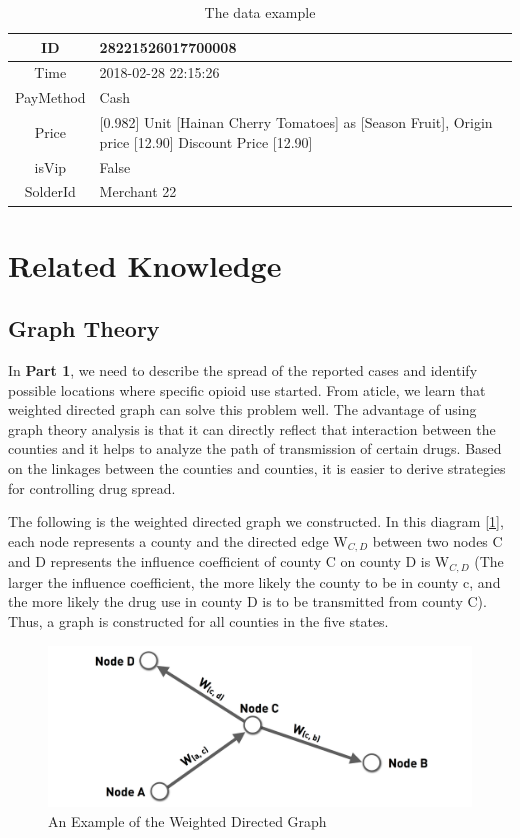 \documentclass{mcmthesis}
\begin{document}
\begin{table}[h]
	\centering
	\caption{The data example} \label{table-notations}
	\begin{tabular}{cp{20em}}
		\toprule
		ID & 28221526017700008\\
		\hline
		Time & 2018-02-28 22:15:26\\
		\hline
		PayMethod & Cash\\
		\hline
		Price & [0.982] Unit [Hainan Cherry Tomatoes] as [Season Fruit], Origin price [12.90] Discount Price [12.90]\\
		\hline
		isVip & False\\
		\hline
		SolderId & Merchant 22\\
		\bottomrule
	\end{tabular}
\end{table}

\section{Related Knowledge}

\subsection*{Graph Theory}
In \textbf{Part 1}, we need to describe the spread of the reported cases and identify possible locations where specific opioid use started. From aticle\cite{2}, we learn that weighted directed graph can solve this problem well. The advantage of using graph theory analysis is that it can directly reflect that interaction between the counties and it helps to analyze the path of transmission of certain drugs. Based on the linkages between the counties and counties, it is easier to derive strategies for controlling drug spread.

The following is the weighted directed graph we constructed. In this diagram [\ref{graph}], each node represents a county and the directed edge W$_{C,D}$ between two nodes C and D represents the influence coefficient of county C on county D is W$_{C,D}$ (The larger the influence coefficient, the more likely the county to be in county c, and the more likely the drug use in county D is to be transmitted from county C). Thus, a graph is constructed for all counties in the five states.
\begin{figure}[h]
	\centering
	\includegraphics[width=15cm]{graphtheory.png}
	\caption{An Example of the Weighted Directed Graph}\label{graph}
\end{figure}
\end{document}
